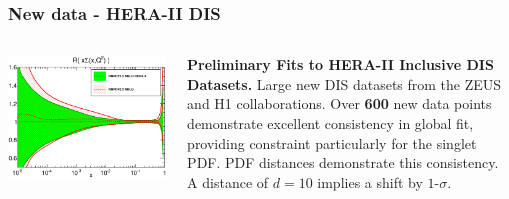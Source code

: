 \documentclass[10pt]{beamer}
\begin{document}
%
%
%
\begin{frame}
\frametitle{New data - HERA-II DIS}

\begin{columns}
  \begin{column}{0.5\textwidth}
     \includegraphics[width=1.0\textwidth]{pdf_xSigma_log_ratio_HERAII.eps}\\

\end{column}
  \begin{column}{0.5\textwidth}

  \small  {\textbf{Preliminary Fits to HERA-II Inclusive DIS Datasets.} }
\vskip5pt
Large new DIS datasets from the ZEUS and H1 collaborations.
\vskip5pt
Over \textbf{600} new data points demonstrate excellent consistency in global
fit, providing constraint particularly for the singlet PDF.
\vskip5pt
PDF distances demonstrate this consistency. A distance of $d = 10$ implies
a shift by $1$-$\sigma$.

\end{column}
\end{columns}


\end{frame}
\end{document}
